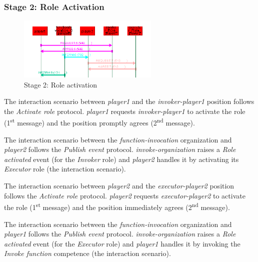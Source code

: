 \subsubsection*{Stage 2: Role Activation}

\begin{figure}[H]
	\centering
	\includegraphics[width=0.6\textwidth]{images/examples/example1-stage2}
	\caption{Stage 2: Role activation}
	\label{figure:example1-stage2}
\end{figure}

The {} interaction scenario between \textit{player1} and the \textit{invoker-player1} position follows the \textit{Activate role} protocol.
\textit{player1} requests \textit{invoker-player1} to activate the role (1\textsuperscript{st} message) and the position promptly agrees (2\textsuperscript{nd} message).

The {} interaction scenario between the \textit{function-invocation} organization and \textit{player2} follows the \textit{Publish event} protocol.
\textit{invoke-organization} raises a \textit{Role activated} event (for the \textit{Invoker} role) and \textit{player2} handles it by activating its \textit{Executor} role (the {} interaction scenario).

The {} interaction scenario between \textit{player2} and the \textit{executor-player2} position follows the \textit{Activate role} protocol.
\textit{player2} requests \textit{executor-player2} to activate the role (1\textsuperscript{st} message) and the position immediately agrees (2\textsuperscript{nd} message).

The {} interaction scenario between the \textit{function-invocation} organization and \textit{player1} follows the \textit{Publish event} protocol.
\textit{invoke-organization} raises a \textit{Role activated} event (for the \textit{Executor} role) and \textit{player1} handles it by invoking the \textit{Invoke function} competence (the {} interaction scenario).

